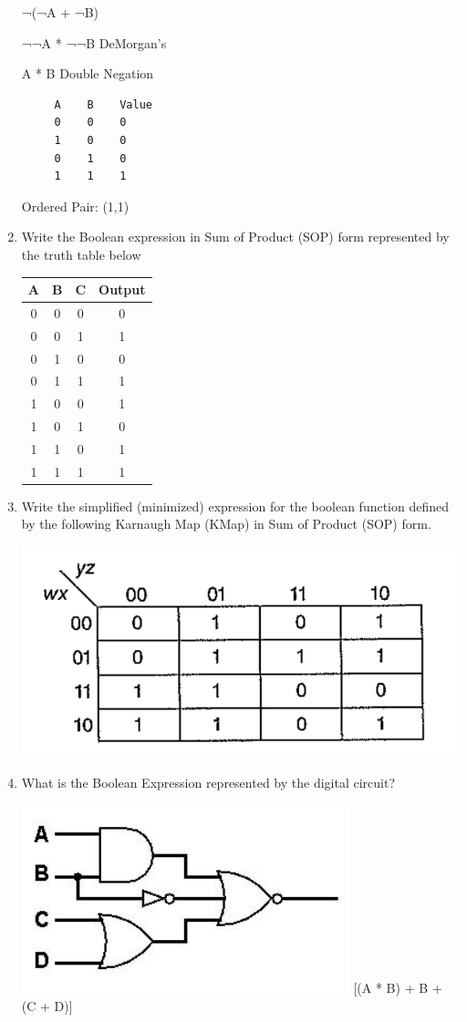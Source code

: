 \documentclass[12pt,a4paper,english]{article}
\newcommand\answer[1]{\color{blue}#1\color{black}}
\begin{document}
\begin{enumerate}
   ¬(¬A + ¬B)
 
    ¬¬A * ¬¬B       DeMorgan's 
 
    A * B       Double Negation
 
  \begin{lstlisting}
     A    B    Value
     0    0    0
     1    0    0
     0    1    0
     1    1    1
   \end{lstlisting}

   \answer{Ordered Pair: (1,1)}

\item Write the Boolean expression in Sum of Product (SOP) form represented by the truth table below
 
\begin{tabular}{c | c | c | c }
 \hline
 A & B & C & Output \\ [0.5ex] 
 \hline
 0 & 0 & 0 & 0 \\
 0 & 0 & 1 & 1 \\
 0 & 1 & 0 & 0 \\
 0 & 1 & 1 & 1 \\
 1 & 0 & 0 & 1 \\
 1 & 0 & 1 & 0 \\
 1 & 1 & 0 & 1 \\
 1 & 1 & 1 & 1 \\
\end{tabular}

\item Write the simplified (minimized) expression for the boolean function defined by the following Karnaugh Map (KMap) in Sum of Product (SOP) form.
  
  \includegraphics[scale=.5]{karnaughmap}

  
\item What is the Boolean Expression represented by the digital circuit?
 
  \includegraphics[scale=.5]{logiccircuit}
  \answer{{\lnot}[(A * B) + {\lnot} B + (C + D)]}


\end{enumerate}
\end{document}

